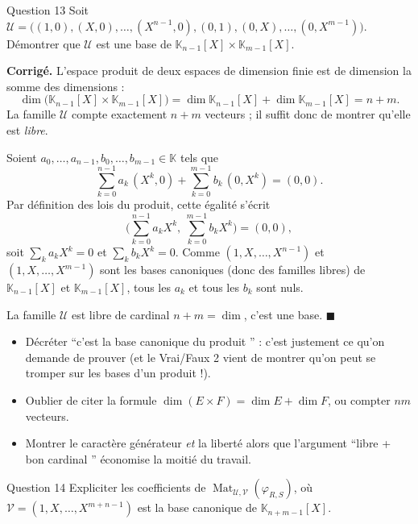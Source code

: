 \documentclass[11pt,a4paper]{article}
\newenvironment{corrige}
  {\par\medskip\noindent
   \begin{tcolorbox}[blanker, breakable,
     borderline west={2.5pt}{0pt}{vertP},
     left=10pt, top=2pt, bottom=2pt]
   {\color{vertP}\bfseries Corrigé.}\hspace{0.5em}\ignorespaces}
  {\hfill$\blacksquare$\end{tcolorbox}\medskip}
\newcommand{\og}{``}
\newcommand{\fg}{''}
\newcommand{\K}{\mathbb{K}}
\DeclareMathOperator{\Mat}{Mat}
\begin{document}
\begin{enonce}{Question 13}
Soit
$\mathcal{U}=\big((1,0),(X,0),\dots,(X^{n-1},0),(0,1),(0,X),\dots,
(0,X^{m-1})\big)$. Démontrer que $\mathcal{U}$ est une base de
$\K_{n-1}[X]\times\K_{m-1}[X]$.
\end{enonce}

\begin{corrige}
L'espace produit de deux espaces de dimension finie est de dimension
la somme des dimensions :
\[
\dim\big(\K_{n-1}[X]\times\K_{m-1}[X]\big)
=\dim\K_{n-1}[X]+\dim\K_{m-1}[X]=n+m .
\]
La famille $\mathcal{U}$ compte exactement $n+m$ vecteurs ; il suffit
donc de montrer qu'elle est \emph{libre}.

Soient $a_0,\dots,a_{n-1},b_0,\dots,b_{m-1}\in\K$ tels que
\[
\sum_{k=0}^{n-1}a_k\,(X^{k},0)+\sum_{k=0}^{m-1}b_k\,(0,X^{k})=(0,0).
\]
Par définition des lois du produit, cette égalité s'écrit
\[
\Big(\sum_{k=0}^{n-1}a_kX^{k},\ \sum_{k=0}^{m-1}b_kX^{k}\Big)=(0,0),
\]
soit $\sum_k a_kX^k=0$ et $\sum_k b_kX^k=0$. Comme
$(1,X,\dots,X^{n-1})$ et $(1,X,\dots,X^{m-1})$ sont les bases
canoniques (donc des familles libres) de $\K_{n-1}[X]$ et
$\K_{m-1}[X]$, tous les $a_k$ et tous les $b_k$ sont nuls.

La famille $\mathcal{U}$ est libre de cardinal $n+m=\dim$, c'est une
base.
\end{corrige}

\begin{pieges}
\begin{itemize}[leftmargin=1.4em, itemsep=2pt]
\item Décréter \og c'est la base canonique du produit \fg{} : c'est
justement ce qu'on demande de prouver (et le Vrai/Faux 2 vient de
montrer qu'on peut se tromper sur les bases d'un produit !).
\item Oublier de citer la formule
$\dim(E\times F)=\dim E+\dim F$, ou compter $nm$ vecteurs.
\item Montrer le caractère générateur \emph{et} la liberté alors que
l'argument \og libre + bon cardinal \fg{} économise la moitié du
travail.
\end{itemize}
\end{pieges}

\begin{enonce}{Question 14}
Expliciter les coefficients de
$\Mat_{\mathcal{U},\mathcal{V}}(\varphi_{R,S})$, où
$\mathcal{V}=(1,X,\dots,X^{m+n-1})$ est la base canonique de
$\K_{n+m-1}[X]$.
\end{enonce}
\end{document}
